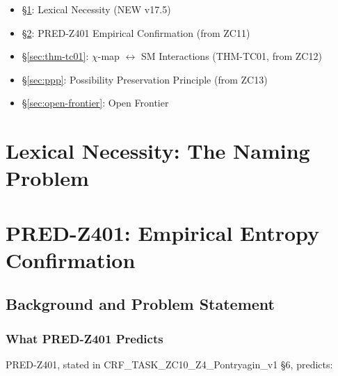 \documentclass[12pt, a4paper]{article}
\begin{document}
\begin{itemize}[leftmargin=2em]
\item \S\ref{sec:lexical-necessity}: Lexical Necessity (NEW v17.5)
\item \S\ref{sec:pred-z401}: PRED-Z401 Empirical Confirmation (from ZC11)
\item \S\ref{sec:thm-tc01}: $\chi$-map $\leftrightarrow$ SM Interactions (THM-TC01, from ZC12)
\item \S\ref{sec:ppp}: Possibility Preservation Principle (from ZC13)
\item \S\ref{sec:open-frontier}: Open Frontier
\end{itemize}

\section{Lexical Necessity: The Naming Problem}
\label{sec:lexical-necessity}




\section{PRED-Z401: Empirical Entropy Confirmation}
\label{sec:pred-z401}

\subsection{Background and Problem Statement}
\label{sec:background}

\subsubsection{What PRED-Z401 Predicts}

PRED-Z401, stated in CRF\_TASK\_ZC10\_Z4\_Pontryagin\_v1 \S6, predicts:
\end{document}
